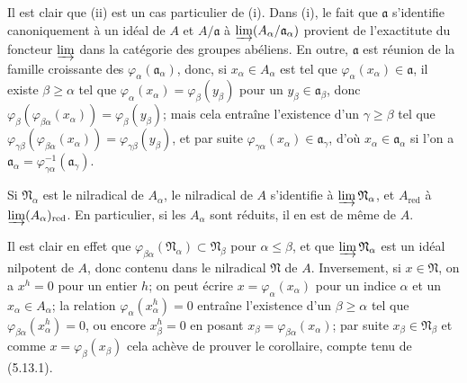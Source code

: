 Il est clair que (ii) est un cas particulier de (i). Dans (i), le fait que
$\mathfrak a$ s'identifie canoniquement à un idéal de $A$ et $A/\mathfrak a$ à
$\varinjlim(A_\alpha/\mathfrak a_\alpha)$ provient de l'exactitute du foncteur
$\varinjlim$ dans la catégorie des groupes abéliens. En outre, $\mathfrak a$
est réunion de la famille croissante des $\varphi_\alpha(\mathfrak a_\alpha)$,
donc, si $x_\alpha\in A_\alpha$ est tel que
$\varphi_\alpha(x_\alpha)\in\mathfrak a$, il existe $\beta\geq\alpha$ tel que
$\varphi_\alpha(x_\alpha)=\varphi_\beta(y_\beta)$ pour un
$y_\beta\in\mathfrak a_\beta$, donc
$\varphi_\beta(\varphi_{\beta\alpha}(x_\alpha))=\varphi_\beta(y_\beta)$; mais
cela entraîne l'existence d'un $\gamma\geq\beta$ tel que
$\varphi_{\gamma\beta}(\varphi_{\beta\alpha}(x_\alpha))=\varphi_{\gamma\beta}(y_\beta)$,
et par suite $\varphi_{\gamma\alpha}(x_\alpha)\in\mathfrak a_\gamma$, d'où
$x_\alpha\in\mathfrak a_\alpha$ si l'on a
$\mathfrak a_\alpha=\varphi_{\gamma\alpha}^{-1}(\mathfrak a_\gamma)$.

\begin{corollary}[5.13.2]
\label{IV.2.s5.13.2-fr}
Si $\mathfrak N_\alpha$ est le nilradical de $A_\alpha$, le nilradical de $A$
s'identifie à $\varinjlim\mathfrak N_\alpha$, et $A_{\mathrm{red}}$ à
$\varinjlim(A_\alpha)_{\mathrm{red}}$. En particulier, si les $A_\alpha$ sont
réduits, il en est de même de $A$.
\end{corollary}


Il est clair en effet que
$\varphi_{\beta\alpha}(\mathfrak N_\alpha)\subset\mathfrak N_\beta$ pour
$\alpha\leq\beta$, et que $\varinjlim\mathfrak N_\alpha$ est un idéal
nilpotent de $A$, donc contenu dans le nilradical $\mathfrak N$ de $A$.
Inversement, si $x\in\mathfrak N$, on a $x^h=0$ pour un entier $h$; on peut
écrire $x=\varphi_\alpha(x_\alpha)$ pour un indice $\alpha$ et un
$x_\alpha\in A_\alpha$; la relation $\varphi_\alpha(x_\alpha^h)=0$ entraîne
l'existence d'un $\beta\geq\alpha$ tel que
$\varphi_{\beta\alpha}(x_\alpha^h)=0$, ou encore $x_\beta^h=0$ en posant
$x_\beta=\varphi_{\beta\alpha}(x_\alpha)$; par suite
$x_\beta\in\mathfrak N_\beta$ et comme $x=\varphi_\beta(x_\beta)$ cela achève
de prouver le corollaire, compte tenu de (5.13.1).

